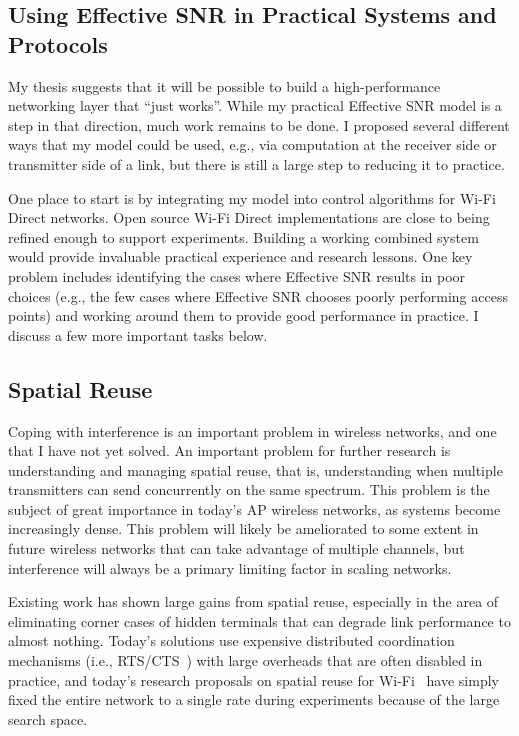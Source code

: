 \subsection{Using Effective SNR in Practical Systems and Protocols}
My thesis suggests that it will be possible to build a high-performance networking layer that ``just works''. While my practical Effective SNR model is a step in that direction, much work remains to be done. I proposed several different ways that my model could be used, e.g., via computation at the receiver side or transmitter side of a link, but there is still a large step to reducing it to practice.

One place to start is by integrating my model into control algorithms for Wi-Fi Direct networks. Open source Wi-Fi Direct implementations are close to being refined enough to support experiments. Building a working combined system would provide invaluable practical experience and research lessons. One key problem includes identifying the cases where Effective SNR results in poor choices (e.g., the few cases where Effective SNR chooses poorly performing access points) and working around them to provide good performance in practice. I discuss a few more important tasks below.

\subsection{Spatial Reuse}
Coping with interference is an important problem in wireless networks, and one that I have not yet solved. An important problem for further research is understanding and managing spatial reuse, that is, understanding when multiple transmitters can send concurrently on the same spectrum. This problem is the subject of great importance in today's AP wireless networks, as systems become increasingly dense. This problem will likely be ameliorated to some extent in future wireless networks that can take advantage of multiple channels, but interference will always be a primary limiting factor in scaling networks.

Existing work has shown large gains from spatial reuse, especially in the area of eliminating corner cases of hidden terminals that can degrade link performance to almost nothing. Today's solutions use expensive distributed coordination mechanisms (i.e., RTS/CTS~\cite{Karn_MACA}) with large overheads that are often disabled in practice, and today's research proposals on spatial reuse for Wi-Fi~\cite{Shrivastava_CENTAUR,Vutukuru_CMAP} have simply fixed the entire network to a single rate during experiments because of the large search space.

